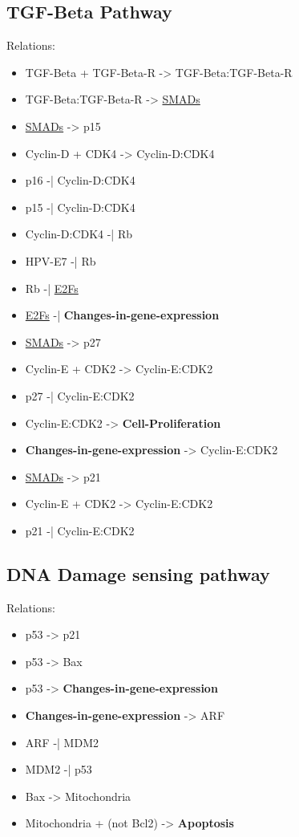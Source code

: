 \documentclass[11pt]{article}
\begin{document}
\subsection{TGF-Beta Pathway}
\label{sec-7-2}
Relations:
\begin{itemize}
\item TGF-Beta + TGF-Beta-R -> TGF-Beta:TGF-Beta-R
\item TGF-Beta:TGF-Beta-R -> \uline{SMADs}

\item \uline{SMADs} -> p15
\item Cyclin-D + CDK4 -> Cyclin-D:CDK4
\item p16 -| Cyclin-D:CDK4
\item p15 -| Cyclin-D:CDK4
\item Cyclin-D:CDK4 -| Rb
\item HPV-E7 -| Rb
\item Rb -| \uline{E2Fs}
\item \uline{E2Fs} -| \textbf{Changes-in-gene-expression}

\item \uline{SMADs} -> p27
\item Cyclin-E + CDK2 -> Cyclin-E:CDK2
\item p27 -| Cyclin-E:CDK2
\item Cyclin-E:CDK2 -> \textbf{Cell-Proliferation}
\item \textbf{Changes-in-gene-expression} -> Cyclin-E:CDK2

\item \uline{SMADs} -> p21
\item Cyclin-E + CDK2 -> Cyclin-E:CDK2
\item p21 -| Cyclin-E:CDK2
\end{itemize}
\subsection{DNA Damage sensing pathway}
\label{sec-7-3}

Relations:
\begin{itemize}
\item p53 -> p21
\item p53 -> Bax
\item p53 -> \textbf{Changes-in-gene-expression}
\item \textbf{Changes-in-gene-expression} -> ARF
\item ARF -| MDM2
\item MDM2 -| p53
\item Bax -> Mitochondria
\item Mitochondria + (not Bcl2) -> \textbf{Apoptosis}
\end{itemize}
\end{document}
